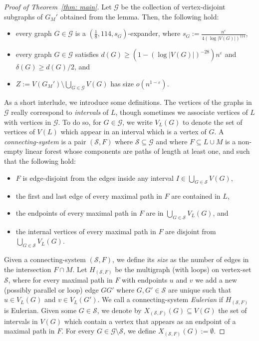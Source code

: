 \documentclass[11pt,reqno]{article}
\begin{document}
\begin{proof}[Proof of Theorem~\ref{thm: main}]
  Let $\mathcal{G}$ be the collection of vertex-disjoint subgraphs of $G_M'$ obtained from the lemma. Then, the following hold:
  \begin{itemize}
      \item every graph $G\in\mathcal{G}$ is a $(\frac{1}{8},114,s_G)$-expander, where $s_G:=\frac{n^\varepsilon}{4(\log |V(G)|)^{114}}$,
      \item every graph $G\in\mathcal{G}$ satisfies $d(G)\ge (1-(\log |V(G)|)^{-28}) n^\varepsilon$ and $\delta(G)\ge d(G)/2$, and
      \item $Z:=V(G_M')\setminus \bigcup_{G\in\mathcal{G}}V(G)$ has size $o(n^{1-\varepsilon})$.
  \end{itemize}

As a short interlude, we introduce some definitions. The vertices of the graphs in $\mathcal G$ really correspond to \emph{intervals} of $L$, though sometimes we associate vertices of $L$ with vertices in $\mathcal G$. To do so, for $G\in\mathcal G$, we write $V_L(G)$ to denote the set of vertices of $V(L)$ which appear in an interval which is a vertex of $G$. A \textit{connecting-system} is a pair $(\mathcal S,F)$ where $\mathcal S\subseteq\mathcal G$ and where $F\subseteq L\cup M$ is a non-empty linear forest whose components are paths of length at least one, and such that the following hold:
\begin{itemize}
    \item $F$ is edge-disjoint from the edges inside any interval $I\in \bigcup_{G\in\mathcal{S}}V(G)$,
    \item the first and last edge of every maximal path in $F$ are contained in $L$,
    \item the endpoints of every maximal path in $F$ are in $\bigcup_{G\in\mathcal{S}}V_L(G)$, and
  \item the internal vertices of every maximal path in $F$ are disjoint from $\bigcup_{G\in\mathcal{S}}V_L(G)$.
\end{itemize}
Given a connecting-system $(\mathcal{S},F)$, we define its \emph{size} as the number of edges in the intersection $F\cap M$.
Let $H_{(\mathcal S,F)}$ be the multigraph (with loops) on vertex-set $\mathcal S$, where for every maximal path in $F$ with endpoints $u$ and $v$ we add a new (possibly parallel or loop) edge $GG'$ where $G,G'\in\mathcal{S}$ are unique such that $u\in V_L(G)$ and $v\in V_L(G')$. We call a connecting-system \emph{Eulerian} if $H_{(\mathcal S,F)}$ is Eulerian. Given some $G\in \mathcal S$, we denote by $X_{(\mathcal S,F)}(G)\subseteq V(G)$ the set of intervals in $V(G)$ which contain a vertex that appears as an endpoint of a maximal path in $F$. For every $G\in \mathcal{G}\setminus \mathcal{S}$, we define $X_{(\mathcal S, F)}(G):=\emptyset$. 


\end{proof}
\end{document}
